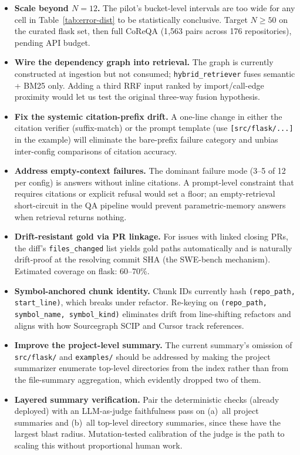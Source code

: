 \documentclass[11pt]{article}
\begin{document}
\begin{itemize}
    \item \textbf{Scale beyond $N=12$.} The pilot's bucket-level intervals are too wide for any cell in Table~\ref{tab:error-dist} to be statistically conclusive. Target $N \geq 50$ on the curated flask set, then full CoReQA (1{,}563 pairs across 176 repositories), pending API budget.
    \item \textbf{Wire the dependency graph into retrieval.} The graph is currently constructed at ingestion but not consumed; \texttt{hybrid\_retriever} fuses semantic + BM25 only. Adding a third RRF input ranked by import/call-edge proximity would let us test the original three-way fusion hypothesis.
    \item \textbf{Fix the systemic citation-prefix drift.} A one-line change in either the citation verifier (suffix-match) or the prompt template (use \texttt{[src/flask/...]} in the example) will eliminate the bare-prefix failure category and unbias inter-config comparisons of citation accuracy.
    \item \textbf{Address empty-context failures.} The dominant failure mode (3--5 of 12 per config) is answers without inline citations. A prompt-level constraint that requires citations or explicit refusal would set a floor; an empty-retrieval short-circuit in the QA pipeline would prevent parametric-memory answers when retrieval returns nothing.
    \item \textbf{Drift-resistant gold via PR linkage.} For issues with linked closing PRs, the diff's \texttt{files\_changed} list yields gold paths automatically and is naturally drift-proof at the resolving commit SHA (the SWE-bench mechanism). Estimated coverage on flask: 60--70\%.
    \item \textbf{Symbol-anchored chunk identity.} Chunk IDs currently hash \texttt{(repo\_path, start\_line)}, which breaks under refactor. Re-keying on \texttt{(repo\_path, symbol\_name, symbol\_kind)} eliminates drift from line-shifting refactors and aligns with how Sourcegraph SCIP and Cursor track references.
    \item \textbf{Improve the project-level summary.} The current summary's omission of \texttt{src/flask/} and \texttt{examples/} should be addressed by making the project summarizer enumerate top-level directories from the index rather than from the file-summary aggregation, which evidently dropped two of them.
    \item \textbf{Layered summary verification.} Pair the deterministic checks (already deployed) with an LLM-as-judge faithfulness pass on (a)~all project summaries and (b)~all top-level directory summaries, since these have the largest blast radius. Mutation-tested calibration of the judge is the path to scaling this without proportional human work.
\end{itemize}
\end{document}
